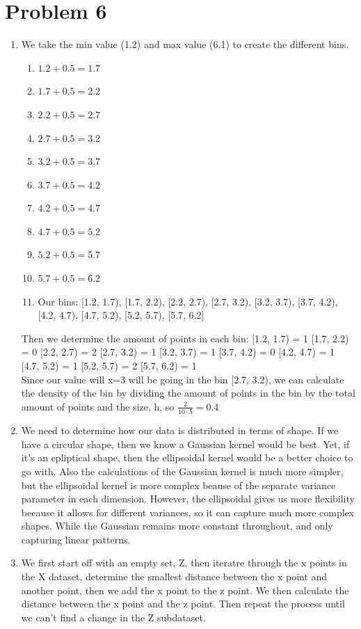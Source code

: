 \documentclass{article}
\begin{document}
\section*{Problem 6}
\begin{enumerate}[label=(\alph*)]
    \item We take the min value (1.2) and max value (6.1) to create the different bins.
    \begin{enumerate}
        \item $1.2 + 0.5 = 1.7$
        \item $1.7 + 0.5 = 2.2$
        \item $2.2 + 0.5 = 2.7$
        \item $2.7 + 0.5 = 3.2$
        \item $3.2 + 0.5 = 3.7$
        \item $3.7 + 0.5 = 4.2$
        \item $4.2 + 0.5 = 4.7$
        \item $4.7 + 0.5 = 5.2$
        \item $5.2 + 0.5 = 5.7$
        \item $5.7 + 0.5 = 6.2$
        \item Our bins: [1.2, 1.7), [1.7, 2.2), [2.2, 2.7), [2.7, 3.2), [3.2, 3.7), [3.7, 4.2), [4.2, 4.7), [4.7, 5.2), [5.2, 5.7), [5.7, 6.2]
    \end{enumerate}
    Then we determine the amount of points in each bin:
         [1.2, 1.7) = 1
         [1.7, 2.2) = 0
         [2.2, 2.7) = 2
         [2.7, 3.2) = 1
         [3.2, 3.7) = 1
         [3.7, 4.2) = 0
         [4.2, 4.7) = 1
         [4.7, 5.2) = 1
         [5.2, 5.7) = 2
         [5.7, 6.2) = 1
    \\Since our value will x=3 will be going in the bin [2.7, 3.2), we can calculate the density of the bin by dividing the amount of points in the bin by the total amount of points and the size, h, so $\frac{2}{10\cdot5} = 0.4$
    \item We need to determine how our data is distributed in terms of shape. If we have a circular shape, then we know a Gaussian kernel would be best. Yet, if it's an epliptical shape, then the ellipsoidal kernel would be a better choice to go with.
    Also the calculations of the Gaussian kernel is much more simpler, but the ellipsoidal kernel is more complex beause of the separate variance parameter in each dimension. However, the ellipsoidal gives us more flexibility because it allows for different variances, so it can capture much more complex shapes. While the Gaussian remains more constant throughout, and only capturing linear patterns.
    \item We first start off with an empty set, Z, then iteratre through the x points in the X dataset, determine the smallest distance between the x point and another point, then we add the x point to the z point. We then calculate the distance between the x point and the z point.
    Then repeat the process until we can't find a change in the Z subdataset.
\end{enumerate}
\end{document}

